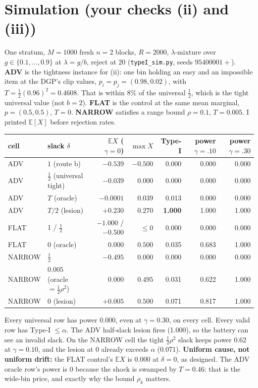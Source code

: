 \documentclass[11pt]{article}
\begin{document}
\section{Simulation (your checks (ii) and (iii))}
One stratum, $M=1000$ fresh $n{=}2$ blocks, $R=2000$, $\lambda$-mixture over $g\in\{0.1,\dots,0.9\}$ at $\lambda=g/b$, reject at $20$ (\texttt{typeI\_sim.py}, seeds $95400001+$). \textbf{ADV} is the tightness instance for (ii): one bin holding an easy and an impossible item at the DGP's clip values, $p_i=p_j=(0.98,0.02)$, with $T=\frac12(0.96)^2=0.4608$. That is within $8\%$ of the universal $\frac12$, which is the tight universal value (not $b=2$). \textbf{FLAT} is the control at the same mean marginal, $p=(0.5,0.5)$, $T=0$. \textbf{NARROW} satisfies a range bound $\rho=0.1$, $T=0.005$. I printed $\mathbb E[X]$ before rejection rates.
\begin{center}\small
\begin{tabular}{llrrrrr}\toprule
cell & slack $\delta$ & $\mathbb E X$ ($\gamma{=}0$) & $\max X$ & Type-I & power $\gamma{=}.10$ & power $\gamma{=}.30$\\\midrule
ADV & $1$ (route b) & $-0.539$ & $-0.500$ & 0.000 & 0.000 & 0.000\\
ADV & $\frac12$ (universal tight) & $-0.039$ & $0.000$ & 0.000 & 0.000 & 0.000\\
ADV & $T$ (oracle) & $-0.0001$ & $0.039$ & 0.013 & 0.000 & 0.000\\
ADV & $T/2$ (lesion) & $+0.230$ & $0.270$ & \textbf{1.000} & 1.000 & 1.000\\
FLAT & $1$ / $\frac12$ & $-1.000$ / $-0.500$ & $\le0$ & 0.000 & 0.000 & 0.000\\
FLAT & $0$ (oracle) & $0.000$ & $0.500$ & 0.035 & 0.683 & 1.000\\
NARROW & $\frac12$ & $-0.495$ & $0.000$ & 0.000 & 0.000 & 0.000\\
NARROW & $0.005$ (oracle $=\frac12\rho^2$) & $0.000$ & $0.495$ & 0.031 & 0.622 & 1.000\\
NARROW & $0$ (lesion) & $+0.005$ & $0.500$ & 0.071 & 0.817 & 1.000\\\bottomrule
\end{tabular}\end{center}
Every universal row has power $0.000$, even at $\gamma=0.30$, on every cell. Every valid row has Type-I $\le\alpha$. The ADV half-slack lesion fires (1.000), so the battery can see an invalid slack. On the NARROW cell the tight $\frac12\rho^2$ slack keeps power $0.62$ at $\gamma=0.10$, and the lesion at $0$ already exceeds $\alpha$ (0.071). \textbf{Uniform cause, not uniform drift:} the FLAT control's $\mathbb E X$ is $0.000$ at $\delta=0$, as designed. The ADV oracle row's power is $0$ because the shock is swamped by $T=0.46$: that is the wide-bin price, and exactly why the bound $\rho_k$ matters.
\end{document}
